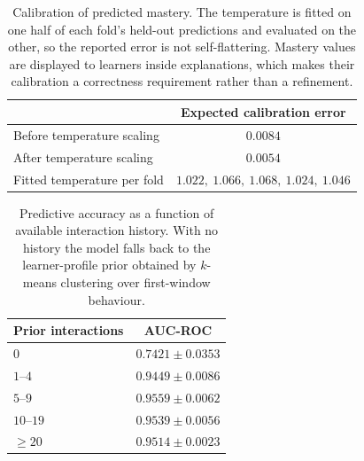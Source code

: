 \begin{table}[t]
\centering
\caption{Calibration of predicted mastery. The temperature is fitted on one half of
each fold's held-out predictions and evaluated on the other, so the reported error is
not self-flattering. Mastery values are displayed to learners inside explanations,
which makes their calibration a correctness requirement rather than a refinement.}
\label{tab:calibration}
\begin{tabular}{lc}
\toprule
 & Expected calibration error \\
\midrule
Before temperature scaling & $0.0084$ \\
After temperature scaling  & $\mathbf{0.0054}$ \\
\midrule
Fitted temperature per fold & \multicolumn{1}{c}{$1.022,\ 1.066,\ 1.068,\ 1.024,\ 1.046$} \\
\bottomrule
\end{tabular}
\end{table}


\begin{table}[t]
\centering
\caption{Predictive accuracy as a function of available interaction history. With no
history the model falls back to the learner-profile prior obtained by $k$-means
clustering over first-window behaviour.}
\label{tab:coldstart}
\begin{tabular}{lc}
\toprule
Prior interactions & AUC-ROC \\
\midrule
$0$        & $0.7421 \pm 0.0353$ \\
$1$--$4$   & $0.9449 \pm 0.0086$ \\
$5$--$9$   & $0.9559 \pm 0.0062$ \\
$10$--$19$ & $0.9539 \pm 0.0056$ \\
$\geq 20$  & $0.9514 \pm 0.0023$ \\
\bottomrule
\end{tabular}
\end{table}


